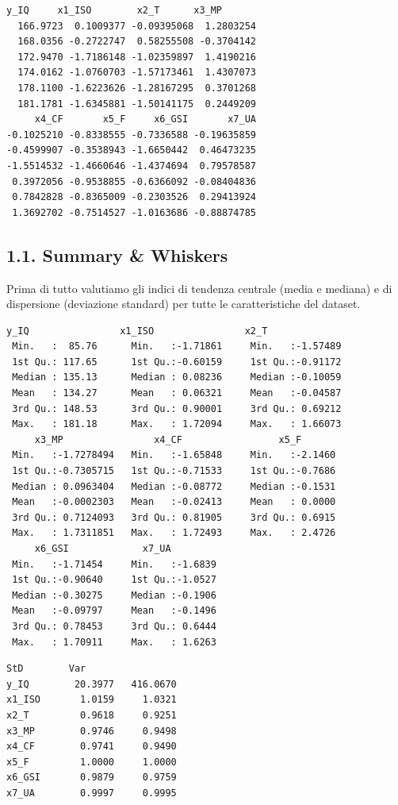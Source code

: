 \begin{lstlisting}[style=rconsole,caption={tail(twist\_sorted)}]
      y_IQ     x1_ISO        x2_T      x3_MP
  166.9723  0.1009377 -0.09395068  1.2803254
  168.0356 -0.2722747  0.58255508 -0.3704142
  172.9470 -1.7186148 -1.02359897  1.4190216
  174.0162 -1.0760703 -1.57173461  1.4307073
  178.1100 -1.6223626 -1.28167295  0.3701268
  181.1781 -1.6345881 -1.50141175  0.2449209
     x4_CF       x5_F     x6_GSI       x7_UA
-0.1025210 -0.8338555 -0.7336588 -0.19635859
-0.4599907 -0.3538943 -1.6650442  0.46473235
-1.5514532 -1.4660646 -1.4374694  0.79578587
 0.3972056 -0.9538855 -0.6366092 -0.08404836
 0.7842828 -0.8365009 -0.2303526  0.29413924
 1.3692702 -0.7514527 -1.0163686 -0.88874785
\end{lstlisting}

\subsection{1.1. Summary \& Whiskers}
\label{sec:11-summary-whiskers}

Prima di tutto valutiamo gli indici di tendenza centrale (media e mediana) e di dispersione (deviazione standard) per tutte le caratteristiche del dataset.

\begin{lstlisting}[style=rconsole,caption={summary}]
      y_IQ                x1_ISO                x2_T
 Min.   :  85.76      Min.   :-1.71861     Min.   :-1.57489
 1st Qu.: 117.65      1st Qu.:-0.60159     1st Qu.:-0.91172
 Median : 135.13      Median : 0.08236     Median :-0.10059
 Mean   : 134.27      Mean   : 0.06321     Mean   :-0.04587
 3rd Qu.: 148.53      3rd Qu.: 0.90001     3rd Qu.: 0.69212
 Max.   : 181.18      Max.   : 1.72094     Max.   : 1.66073
     x3_MP                x4_CF                 x5_F
 Min.   :-1.7278494   Min.   :-1.65848     Min.   :-2.1460
 1st Qu.:-0.7305715   1st Qu.:-0.71533     1st Qu.:-0.7686
 Median : 0.0963404   Median :-0.08772     Median :-0.1531
 Mean   :-0.0002303   Mean   :-0.02413     Mean   : 0.0000
 3rd Qu.: 0.7124093   3rd Qu.: 0.81905     3rd Qu.: 0.6915
 Max.   : 1.7311851   Max.   : 1.72493     Max.   : 2.4726
     x6_GSI             x7_UA
 Min.   :-1.71454     Min.   :-1.6839
 1st Qu.:-0.90640     1st Qu.:-1.0527
 Median :-0.30275     Median :-0.1906
 Mean   :-0.09797     Mean   :-0.1496
 3rd Qu.: 0.78453     3rd Qu.: 0.6444
 Max.   : 1.70911     Max.   : 1.6263
\end{lstlisting}

\begin{lstlisting}[style=rconsole,caption={deviazione standard e varianza}]
                StD        Var
y_IQ        20.3977   416.0670
x1_ISO       1.0159     1.0321
x2_T         0.9618     0.9251
x3_MP        0.9746     0.9498
x4_CF        0.9741     0.9490
x5_F         1.0000     1.0000
x6_GSI       0.9879     0.9759
x7_UA        0.9997     0.9995
\end{lstlisting}


